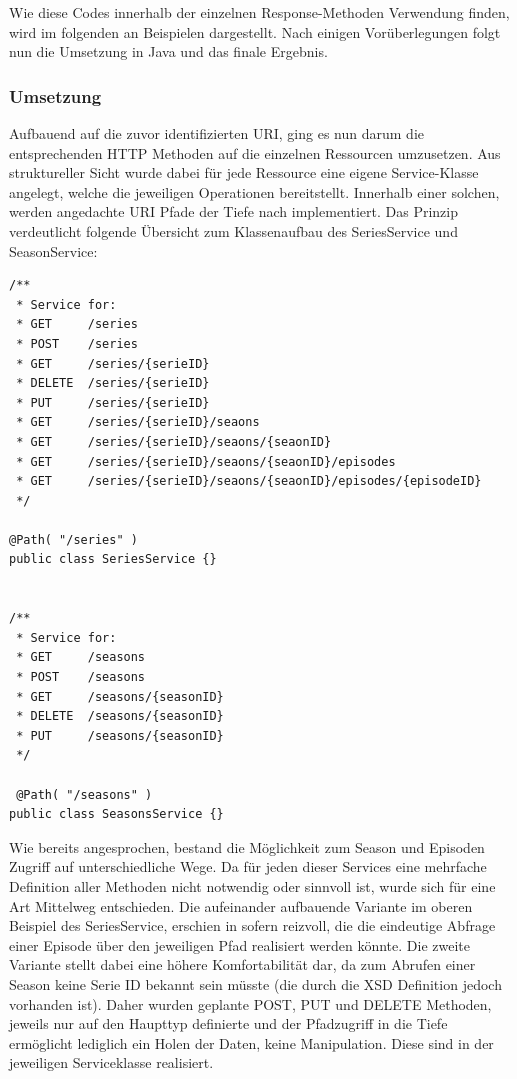 Wie diese Codes innerhalb der einzelnen Response-Methoden Verwendung finden, wird im folgenden an Beispielen dargestellt. Nach einigen Vorüberlegungen folgt nun die Umsetzung in Java und das finale Ergebnis.

\newpage
\subsubsection{Umsetzung}

Aufbauend auf die zuvor identifizierten URI, ging es nun darum die entsprechenden HTTP Methoden auf die einzelnen Ressourcen umzusetzen. Aus struktureller Sicht wurde dabei für jede Ressource eine eigene Service-Klasse angelegt, welche die jeweiligen Operationen bereitstellt. Innerhalb einer solchen, werden angedachte URI Pfade der Tiefe nach implementiert. Das Prinzip verdeutlicht folgende Übersicht zum Klassenaufbau des SeriesService und SeasonService:

\begin{lstlisting}[label=listsservice,caption= Klassenaufbau von BeispielServices]
/**
 * Service for:
 * GET     /series
 * POST    /series
 * GET     /series/{serieID}
 * DELETE  /series/{serieID}
 * PUT     /series/{serieID}
 * GET     /series/{serieID}/seaons
 * GET     /series/{serieID}/seaons/{seaonID}
 * GET     /series/{serieID}/seaons/{seaonID}/episodes
 * GET     /series/{serieID}/seaons/{seaonID}/episodes/{episodeID}
 */

@Path( "/series" )
public class SeriesService {}


/**
 * Service for:
 * GET     /seasons
 * POST    /seasons
 * GET     /seasons/{seasonID}
 * DELETE  /seasons/{seasonID}
 * PUT     /seasons/{seasonID}
 */

 @Path( "/seasons" )
public class SeasonsService {}

\end{lstlisting}

Wie bereits angesprochen, bestand die Möglichkeit zum Season und Episoden Zugriff auf unterschiedliche Wege. Da für jeden dieser Services eine mehrfache Definition aller Methoden nicht notwendig oder sinnvoll ist, wurde sich für eine Art Mittelweg entschieden. Die aufeinander aufbauende Variante im oberen Beispiel des SeriesService, erschien in sofern reizvoll, die die eindeutige Abfrage einer Episode über den jeweiligen Pfad realisiert werden könnte. Die zweite Variante stellt dabei eine höhere Komfortabilität dar, da zum Abrufen einer Season keine Serie ID bekannt sein müsste (die durch die XSD Definition jedoch vorhanden ist).
Daher wurden geplante POST, PUT und DELETE Methoden, jeweils nur auf den Haupttyp definierte und der Pfadzugriff in die Tiefe ermöglicht lediglich ein Holen der Daten, keine Manipulation. Diese sind in der jeweiligen Serviceklasse realisiert.

